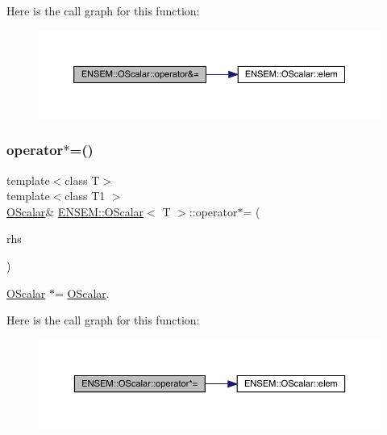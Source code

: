 Here is the call graph for this function\+:
\nopagebreak
\begin{figure}[H]
\begin{center}
\leavevmode
\includegraphics[width=350pt]{da/d80/classENSEM_1_1OScalar_a9a192875355f059d207c579e2514b2a3_cgraph}
\end{center}
\end{figure}
\mbox{\label{classENSEM_1_1OScalar_a9977cd15ef5da689d65713ddf0768085}} 
\subsubsection{\texorpdfstring{operator$\ast$=()}{operator*=()}\hspace{0.1cm}{\footnotesize\ttfamily [1/3]}}
{\footnotesize\ttfamily template$<$class T$>$ \\
template$<$class T1 $>$ \\
\mbox{\hyperlink{classENSEM_1_1OScalar}{O\+Scalar}}\& \mbox{\hyperlink{classENSEM_1_1OScalar}{E\+N\+S\+E\+M\+::\+O\+Scalar}}$<$ T $>$\+::operator$\ast$= (\begin{DoxyParamCaption}\item[{const \mbox{\hyperlink{classENSEM_1_1OScalar}{O\+Scalar}}$<$ T1 $>$ \&}]{rhs }\end{DoxyParamCaption})\hspace{0.3cm}{\ttfamily [inline]}}



\mbox{\hyperlink{classENSEM_1_1OScalar}{O\+Scalar}} $\ast$= \mbox{\hyperlink{classENSEM_1_1OScalar}{O\+Scalar}}. 

Here is the call graph for this function\+:
\nopagebreak
\begin{figure}[H]
\begin{center}
\leavevmode
\includegraphics[width=350pt]{da/d80/classENSEM_1_1OScalar_a9977cd15ef5da689d65713ddf0768085_cgraph}
\end{center}
\end{figure}
\mbox{\label{classENSEM_1_1OScalar_a9977cd15ef5da689d65713ddf0768085}} 
